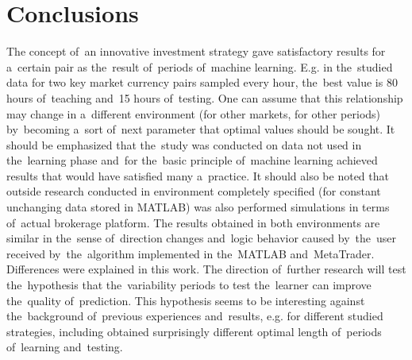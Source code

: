 \documentclass[runningheads,a4paper]{llncs}
\begin{document}
\section{Conclusions}

The concept of~an innovative investment strategy gave satisfactory results for a~certain pair as the~result of~periods of~machine learning. E.g. in the~studied data for two key market currency pairs sampled every hour, the~best value is 80 hours of~teaching and~15 hours of~testing. One can assume that this relationship may change in a~different environment (for other markets, for other periods) by~becoming a~sort of~next parameter that optimal values should be sought. It should be emphasized that the~study was conducted on data not used in the~learning phase and~for the~basic principle of~machine learning achieved results that would have satisfied many a~practice. It should also be noted that outside research conducted in environment completely specified (for constant unchanging data stored in MATLAB) was also performed simulations in terms of~actual brokerage platform. The results obtained in both environments are similar in the~sense of~direction changes and~logic behavior caused by~the~user received by~the~algorithm implemented in the~MATLAB and~MetaTrader. Differences were explained in this work.
The direction of~further research will test the~hypothesis that the~variability periods to test the~learner can improve the~quality of~prediction. This hypothesis seems to be interesting against the~background of~previous experiences and~results, e.g. for different studied strategies, including \cite{Wilinski2014}\cite{Wilinski}\cite{sinclare}\cite{krutsinger} obtained surprisingly different optimal length of~periods of~learning and~testing.





\end{document}
